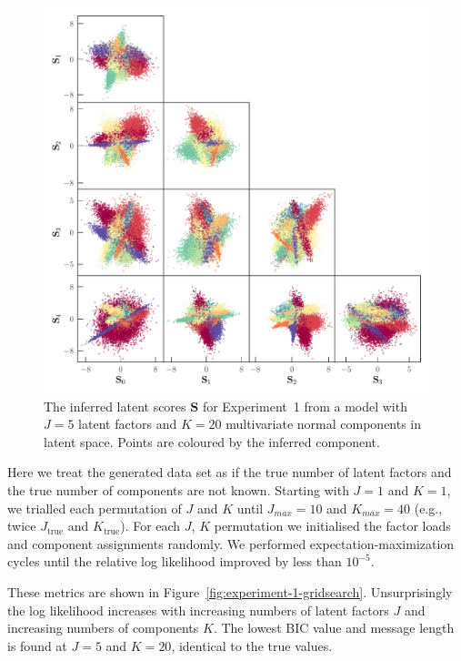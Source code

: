 \documentclass[twocolumn]{aastex62}
\newcommand{\factorscores}{\textbf{S}}
\newcommand{\NumLatentFactors}{J}
\newcommand{\NumComponents}{K}
\begin{document}
\begin{figure}
	\includegraphics[width=\textwidth]{experiments/exp1-latent.pdf}
    \caption{The inferred latent scores $\factorscores$ for Experiment~1
    		 from a model with $\NumLatentFactors = 5$ latent factors and
		 	 $\NumComponents = 20$ multivariate normal components in
			 latent space.
             Points are coloured by the inferred component.}
    \label{fig:exp1-latent}
\end{figure}


Here we treat the generated data set as if the true number of latent factors
and the true number of components are not known. Starting with $\NumLatentFactors = 1$
and $\NumComponents = 1$, we trialled each permutation of $\NumLatentFactors$ and $\NumComponents$
until $\NumLatentFactors_{max} = 10$
and   $\NumComponents_{max} = 40$ (e.g., twice $\NumLatentFactors_\textrm{true}$ and $\NumComponents_\textrm{true}$).
For each $\NumLatentFactors$, $\NumComponents$ permutation we initialised the factor
loads and component assignments randomly. We performed expectation-maximization 
cycles until the relative log likelihood improved by less than $10^{-5}$. 



These metrics are shown in Figure~\ref{fig:experiment-1-gridsearch}.
Unsurprisingly the log likelihood increases with increasing numbers of latent
factors $\NumLatentFactors$ and increasing numbers of components $\NumComponents$.
The lowest BIC value and message length is found at $\NumLatentFactors = 5$
and $\NumComponents = 20$, identical to the true values.
\end{document}
